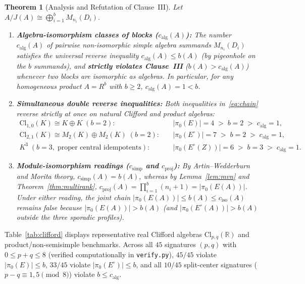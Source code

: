 \documentclass[11pt,a4paper]{article}
\newtheorem{theorem}{Theorem}[section]
\theoremstyle{definition}
\newcommand{\R}{\mathbb{R}}
\newcommand{\Cl}{\mathrm{Cl}}
\begin{document}
\begin{theorem}[Analysis and Refutation of Clause~III]\label{thm:clause3}
Let $A/J(A)\cong\bigoplus_{i=1}^b M_{n_i}(D_i)$.
\begin{enumerate}
  \setlength{\itemsep}{2pt}
  \item \textbf{Algebra-isomorphism classes of blocks ($c_{\mathrm{alg}}(A)$):} The number
    $c_{\mathrm{alg}}(A)$ of pairwise non-isomorphic simple algebra summands $M_{n_i}(D_i)$
    satisfies the \emph{universal reverse inequality} $c_{\mathrm{alg}}(A)\le b(A)$ (by
    pigeonhole on the $b$ summands), and \textbf{strictly violates Clause~III}
    ($b(A) > c_{\mathrm{alg}}(A)$) whenever two blocks are isomorphic as algebras. In
    particular, for any homogeneous product $A = R^b$ with $b\ge 2$, $c_{\mathrm{alg}}(A)=1 < b$.
  \item \textbf{Simultaneous double reverse inequalities:} Both inequalities in~\eqref{eq:chain}
    reverse strictly at once on natural Clifford and product algebras:
    \begin{align*}
      \Cl_{1,0}(K)\cong K\oplus K\;(b=2): \quad
        &\bigl|\pi_0(E)\bigr| = 4 \;>\; b = 2 \;>\; c_{\mathrm{alg}} = 1,\\
      \Cl_{2,1}(K)\cong M_2(K)\oplus M_2(K)\;(b=2): \quad
        &\bigl|\pi_0(E^\circ)\bigr| = 7 \;>\; b = 2 \;>\; c_{\mathrm{alg}} = 1,\\
      K^3\;(b=3,\;\text{proper central idempotents}): \quad
        &\bigl|\pi_0(E^\circ(Z))\bigr| = 6 \;>\; b = 3 \;>\; c_{\mathrm{alg}} = 1.
    \end{align*}
  \item \textbf{Module-isomorphism readings ($c_{\mathrm{simp}}$ and $c_{\mathrm{proj}}$):}
    By Artin--Wedderburn and Morita theory, $c_{\mathrm{simp}}(A)=b(A)$, whereas by
    Lemma~\ref{lem:mvn} and Theorem~\ref{thm:multirank},
    $c_{\mathrm{proj}}(A) = \prod_{i=1}^b(n_i+1) = |\pi_0(E(A))|$. Under either reading, the
    joint chain $|\pi_0(E(A))|\le b(A)\le c_{\mathrm{iso}}(A)$ remains false because
    $|\pi_0(E(A))|>b(A)$ (and $|\pi_0(E^\circ(A))|>b(A)$ outside the three sporadic profiles).
\end{enumerate}
\end{theorem}

Table~\ref{tab:clifford} displays representative real Clifford algebras $\Cl_{p,q}(\R)$ and
product/non-semisimple benchmarks. Across all $45$ signatures $(p,q)$ with $0\le p+q\le 8$
(verified computationally in \texttt{verify.py}), $45/45$ violate $|\pi_0(E)|\le b$, $33/45$
violate $|\pi_0(E^\circ)|\le b$, and all $10/45$ split-center signatures
($p-q\equiv 1,5\pmod 8$) violate $b\le c_{\mathrm{alg}}$.
\end{document}
